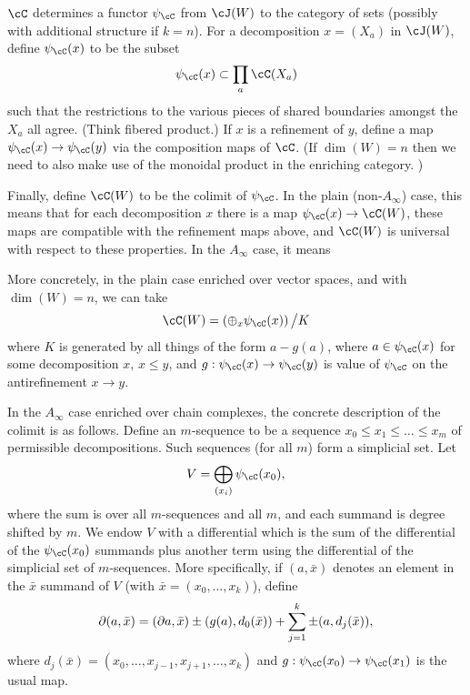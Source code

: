 $\cC$ determines 
a functor $\psi_\cC$ from $\cJ(W)$ to the category of sets 
(possibly with additional structure if $k=n$).
For a decomposition $x = (X_a)$ in $\cJ(W)$, define $\psi_\cC(x)$ to be the subset
\[
	\psi_\cC(x) \sub \prod_a \cC(X_a)
\]
such that the restrictions to the various pieces of shared boundaries amongst the
$X_a$ all agree.
(Think fibered product.)
If $x$ is a refinement of $y$, define a map $\psi_\cC(x)\to\psi_\cC(y)$
via the composition maps of $\cC$.
(If $\dim(W) = n$ then we need to also make use of the monoidal
product in the enriching category.
)

Finally, define $\cC(W)$ to be the colimit of $\psi_\cC$.
In the plain (non-$A_\infty$) case, this means that
for each decomposition $x$ there is a map
$\psi_\cC(x)\to \cC(W)$, these maps are compatible with the refinement maps
above, and $\cC(W)$ is universal with respect to these properties.
In the $A_\infty$ case, it means 

More concretely, in the plain case enriched over vector spaces, and with $\dim(W) = n$, we can take
\[
	\cC(W) = \left( \oplus_x \psi_\cC(x)\right) \big/ K
\]
where $K$ is generated by all things of the form $a - g(a)$, where
$a\in \psi_\cC(x)$ for some decomposition $x$, $x\le y$, and $g: \psi_\cC(x)
\to \psi_\cC(y)$ is value of $\psi_\cC$ on the antirefinement $x\to y$.

In the $A_\infty$ case enriched over chain complexes, the concrete description of the colimit
is as follows.
Define an $m$-sequence to be a sequence $x_0 \le x_1 \le \dots \le x_m$ of permissible decompositions.
Such sequences (for all $m$) form a simplicial set.
Let
\[
	V = \bigoplus_{(x_i)} \psi_\cC(x_0) ,
\]
where the sum is over all $m$-sequences and all $m$, and each summand is degree shifted by $m$.
We endow $V$ with a differential which is the sum of the differential of the $\psi_\cC(x_0)$
summands plus another term using the differential of the simplicial set of $m$-sequences.
More specifically, if $(a, \bar{x})$ denotes an element in the $\bar{x}$
summand of $V$ (with $\bar{x} = (x_0,\dots,x_k)$), define
\[
	\partial (a, \bar{x}) = (\partial a, \bar{x}) \pm (g(a), d_0(\bar{x})) + \sum_{j=1}^k \pm (a, d_j(\bar{x})) ,
\]
where $d_j(\bar{x}) = (x_0,\dots,x_{j-1},x_{j+1},\dots,x_k)$ and $g: \psi_\cC(x_0)\to \psi_\cC(x_1)$
is the usual map.

